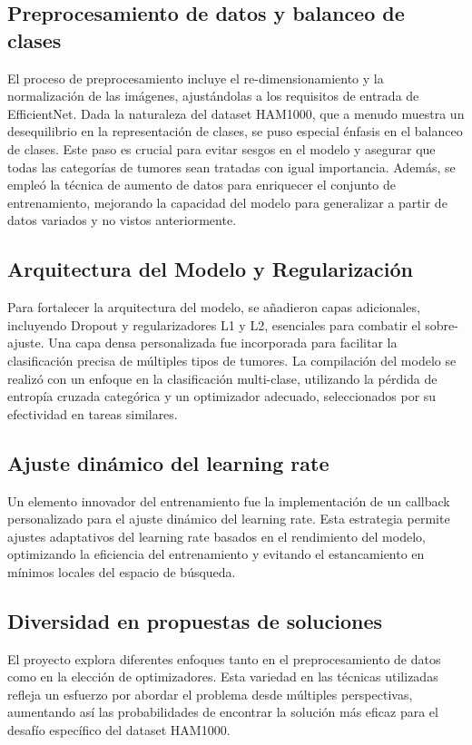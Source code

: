 \subsection{Preprocesamiento de datos y balanceo de clases}

El proceso de preprocesamiento incluye el re-dimensionamiento y la normalización de las imágenes, ajustándolas a los requisitos de entrada de EfficientNet. Dada la naturaleza del dataset HAM1000, que a menudo muestra un desequilibrio en la representación de clases, se puso especial énfasis en el balanceo de clases. Este paso es crucial para evitar sesgos en el modelo y asegurar que todas las categorías de tumores sean tratadas con igual importancia. Además, se empleó la técnica de aumento de datos para enriquecer el conjunto de entrenamiento, mejorando la capacidad del modelo para generalizar a partir de datos variados y no vistos anteriormente.

\subsection{Arquitectura del Modelo y Regularización}

Para fortalecer la arquitectura del modelo, se añadieron capas adicionales, incluyendo Dropout y regularizadores L1 y L2, esenciales para combatir el sobre-ajuste. Una capa densa personalizada fue incorporada para facilitar la clasificación precisa de múltiples tipos de tumores. La compilación del modelo se realizó con un enfoque en la clasificación multi-clase, utilizando la pérdida de entropía cruzada categórica y un optimizador adecuado, seleccionados por su efectividad en tareas similares.

\subsection{Ajuste dinámico del learning rate}

Un elemento innovador del entrenamiento fue la implementación de un callback personalizado para el ajuste dinámico del learning rate. Esta estrategia permite ajustes adaptativos del learning rate basados en el rendimiento del modelo, optimizando la eficiencia del entrenamiento y evitando el estancamiento en mínimos locales del espacio de búsqueda.

\subsection{Diversidad en propuestas de soluciones}

El proyecto explora diferentes enfoques tanto en el preprocesamiento de datos como en la elección de optimizadores. Esta variedad en las técnicas utilizadas refleja un esfuerzo por abordar el problema desde múltiples perspectivas, aumentando así las probabilidades de encontrar la solución más eficaz para el desafío específico del dataset HAM1000.